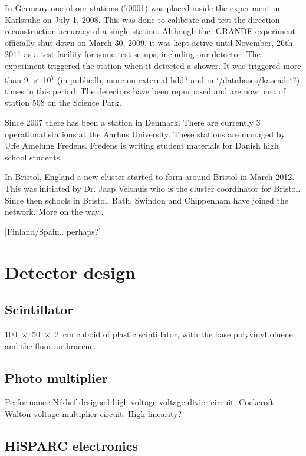In Germany one of our stations (70001) was placed inside the \kascade
experiment in Karlsruhe on July 1, 2008. This was done to calibrate and
test the direction reconstruction accuracy of a single \hisparc station.
Although the \kascade-GRANDE experiment officially shut down on March
30, 2009, it was kept active until November, 26th 2011 as a test
facility for some test setups, including our detector. The \kascade
experiment triggered the \hisparc station when it detected a shower. It
was triggered more than \num{9e7} (in publicdb, more on external hdd?
and in `/databases/kascade`?) times in this period. The detectors have
been repurposed and are now part of station 508 on the Science Park.

Since 2007 there has been a \hisparc station in
Denmark. There are currently 3 operational stations at the Aarhus
University. These stations are managed by Uffe Amelung Fredens.
Fredens is writing student materials for Danish high school students.

In Bristol, England a new cluster started to form around Bristol in
March 2012. This was initiated by Dr. Jaap Velthuis who is the cluster
coordinator for Bristol. Since then schools in Bristol, Bath, Swindon
and Chippenham have joined the network. More on the way..

[Finland/Spain.. perhaps?]


\section{Detector design}
\label{sec:detector_design}

\subsection{Scintillator}

\SI{100 x 50 x 2}{\centi\meter} cuboid of plastic scintillator, with the
base polyvinyltoluene and the fluor anthracene.


\subsection{Photo multiplier}

Performance
Nikhef designed high-voltage voltage-divier circuit.
Cockcroft-Walton voltage multiplier circuit.
High linearity?


\subsection{HiSPARC electronics}

